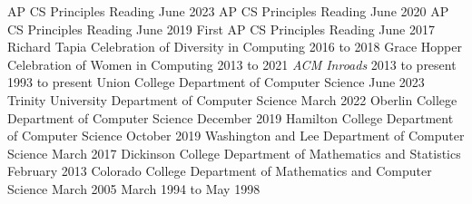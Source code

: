 
\begin{cventries}

    {AP CS Principles Reading}
    {June 2023}
    {AP CS Principles Reading}
    {June 2020}
    {AP CS Principles Reading}
    {June 2019}
    {First AP CS Principles Reading}
    {June 2017}
    {Richard Tapia Celebration of Diversity in Computing}
    {2016 to 2018}
    {Grace Hopper Celebration of Women in Computing}
    {2013 to 2021}
    {\textsl{ACM Inroads}}
    {2013 to present}
    {}
    {1993 to present}
    {Union College Department of Computer Science}
    {June 2023}
    {Trinity University Department of Computer Science}
    {March 2022}
    {Oberlin College Department of Computer Science}
    {December 2019}
    {Hamilton College Department of Computer Science}
    {October 2019}
    {Washington and Lee Department of Computer Science}
    {March 2017}
    {Dickinson College Department of Mathematics and Statistics}
    {February 2013}
    {Colorado College Department of Mathematics and Computer Science}
    {March 2005}
    {}
    {March 1994 to May 1998}

\end{cventries}

